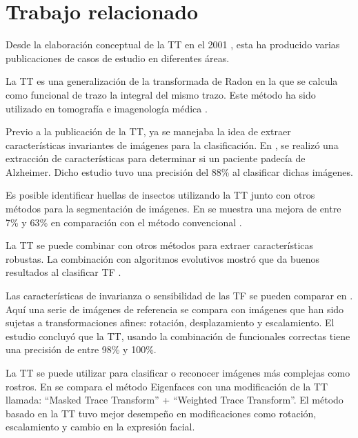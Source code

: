   
\section{Trabajo relacionado}

Desde la elaboración conceptual de la TT en el 2001 \cite{Kadyrov2001}, esta ha producido varias publicaciones de casos de estudio en diferentes áreas.

La TT es una generalización de la transformada de Radon \cite{Ginkel2004} \cite{Kadyrov2003} en la que se calcula como funcional de trazo la integral del mismo trazo. Este método ha sido utilizado en tomografía e imagenología médica \cite{Tutorial2008}.

Previo a la publicación de la TT, ya se manejaba la idea de extraer características invariantes de imágenes para la clasificación. En \cite{Sayeed2001}, se realizó una extracción de características para determinar si un paciente padecía de Alzheimer. Dicho estudio tuvo una precisión del 88\% al clasificar dichas imágenes.


Es posible identificar huellas de insectos utilizando la TT junto con otros métodos para la segmentación de imágenes. En \cite{Bok2008} se muestra una mejora de entre 7\% y 63\% en comparación con el método convencional \cite{Shin2007}.

La TT se puede combinar con otros métodos para extraer características robustas. La combinación con algoritmos evolutivos mostró que da buenos resultados al clasificar TF \cite{Albukhanajer2013}.

Las características de invarianza o sensibilidad de las TF se pueden comparar en \cite{Turan2005}. Aquí una serie de imágenes de referencia se compara con imágenes que han sido sujetas a transformaciones afines: rotación, desplazamiento y escalamiento. El estudio concluyó que la TT, usando la combinación de funcionales correctas tiene una precisión de entre 98\% y 100\%.

La TT se puede utilizar para clasificar o reconocer imágenes más complejas como rostros. En \cite{Srisuky2003} se compara el método Eigenfaces\cite{Zhang1997} con una modificación de la TT llamada: ``Masked Trace Transform'' + ``Weighted Trace Transform''. El método basado en la TT tuvo mejor desempeño en modificaciones como rotación, escalamiento y cambio en la expresión facial.

